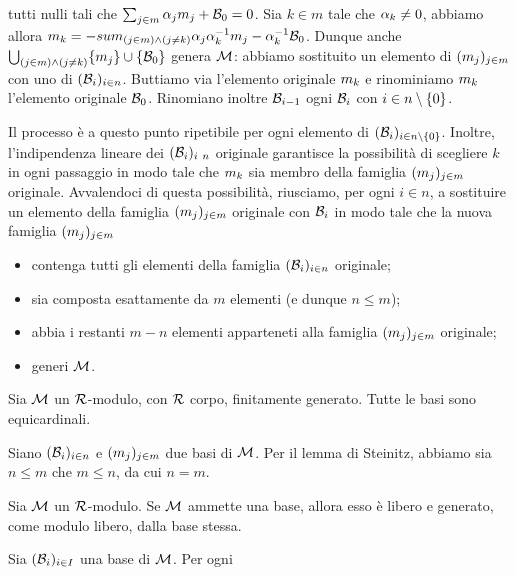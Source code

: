 tutti nulli tali che
$\sum_{j \in m} \alpha_j m_j + \mathcal{B}_0 = 0$. Sia
$k \in m$ tale che $\alpha_k \neq 0$, abbiamo allora
$m_k =
- sum_{\left ( j \in m \right ) \wedge \left ( j \neq k \right )} \alpha_j\alpha_k^{-1} m_j -
\alpha_k^{-1} \mathcal{B}_0$.
Dunque anche
$\bigcup_{\left ( j \in m \right ) \wedge \left ( j \neq k \right )} \lbrace m_j \rbrace \cup
\lbrace \mathcal{B}_0 \rbrace$ genera $\mathcal{M}$: abbiamo sostituito un
elemento di $(m_j)_{j \in m}$ con uno di
$(\mathcal{B}_i)_{i \in n}$. Buttiamo via l'elemento originale
$m_k$ e rinominiamo $m_k$ l'elemento
originale $\mathcal{B}_0$. Rinomiano inoltre $\mathcal{B}_{i - 1}$ ogni
$\mathcal{B}_i$ con $i \in n \setminus \lbrace 0 \rbrace$.
\par Il processo \`e a questo punto ripetibile per ogni
elemento di $(\mathcal{B}_i)_{i \in n \setminus \lbrace 0 \rbrace}$. Inoltre, l'indipendenza
lineare dei $(\mathcal{B}_i)_{i \ n}$ originale garantisce
la possibilit\`a di scegliere $k$ in ogni passaggio in modo tale che
$m_k$ sia membro della famiglia
$(m_j)_{j \in m}$ originale. Avvalendoci di questa
possibilit\`a, riusciamo, per ogni $i \in n$, a sostituire un elemento
della famiglia $(m_j)_{j \in m}$ originale con
$\mathcal{B}_i$ in modo tale che la nuova famiglia
$(m_j)_{j \in m}$
\begin{itemize}
	\item contenga tutti gli elementi della famiglia
	$(\mathcal{B}_i)_{i \in n}$ originale;
	\item sia composta esattamente da $m$ elementi (e dunque
	$n \leq m$);
	\item abbia i restanti $m - n$ elementi apparteneti alla famiglia
	$(m_j)_{j \in m}$ originale;
	\item generi $\mathcal{M}$. \EndProof
\end{itemize}
\begin{Corollary}
	Sia $\mathcal{M}$ un $\mathcal{R}$-modulo, con $\mathcal{R}$ corpo,
	finitamente generato. Tutte le basi sono equicardinali.
\end{Corollary}
\Proof Siano $(\mathcal{B}_i)_{i \in n}$ e $(m_j)_{j \in m}$
due basi di $\mathcal{M}$. Per il lemma di Steinitz, abbiamo sia $n \leq m$
che $m \leq n$, da cui $n = m$. \EndProof
\begin{Theorem}
	Sia $\mathcal{M}$ un $\mathcal{R}$-modulo. Se $\mathcal{M}$ ammette una base,
	allora esso \`e libero e generato, come modulo libero, dalla base
	stessa.
\end{Theorem}
\Proof Sia $(\mathcal{B}_i)_{i \in I}$ una base di $\mathcal{M}$. Per ogni
